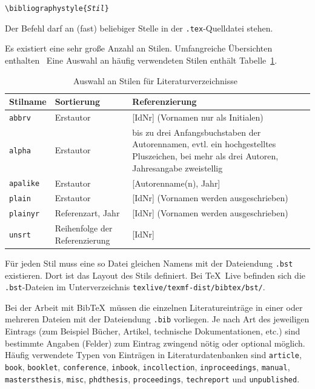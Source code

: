 \documentclass[a4paper,10pt,twoside]{scrbook}
\begin{document}
\begin{boxedminipage}{\textwidth}
	\texttt{\textbackslash bibliographystyle\{\textsl{Stil}\}} 
\end{boxedminipage}


Der Befehl darf an (fast) beliebiger Stelle in der \verb!.tex!-Quelldatei stehen.


Es existiert eine sehr große Anzahl an Stilen. Umfangreiche Übersichten enthalten~\cite{voss2007referenz,BibtexStylesShareLaTeXWebseite} Eine Auswahl an häufig verwendeten Stilen enthält Tabelle~\ref{Tabelle_Stile_Literaturverzeichnisse}. 



\begin{table}[h!tb]
	\centering
	\caption[Auswahl an Stilen für Literaturverzeichnisse]{Auswahl an Stilen für Literaturverzeichnisse~\cite{Wikibooks_LaTeX_Woerterbuch}}
	\label{Tabelle_Stile_Literaturverzeichnisse}       %
	\begin{tabularx}{\textwidth}{lp{3cm}p{7.5cm}}
		\hline
		Stilname & Sortierung & Referenzierung  \\
		\hline
		\texttt{abbrv} & Erstautor & [IdNr] (Vornamen nur als Initialen) \\
		\texttt{alpha} & Erstautor & bis zu drei Anfangsbuchstaben der Autorennamen, evtl. ein hochgestelltes Pluszeichen, bei mehr als drei Autoren, Jahresangabe zweistellig \\			
		\texttt{apalike} & Erstautor & [Autorenname(n), Jahr] \\
		\texttt{plain}   & Erstautor & [IdNr] (Vornamen werden ausgeschrieben) \\
        \texttt{plainyr} & Referenzart, Jahr   & [IdNr] (Vornamen werden ausgeschrieben) \\
        \texttt{unsrt}   & Reihenfolge der Referenzierung & [IdNr] \\
		\hline
	\end{tabularx}
\end{table}

Für jeden Stil muss eine so Datei gleichen Namens mit der Dateiendung \verb!.bst! existieren. Dort ist das Layout des Stils definiert.
Bei \TeX~Live befinden sich die \verb!.bst!-Dateien im Unterverzeichnis \verb|texlive/texmf-dist/bibtex/bst/|.


Bei der Arbeit mit Bib\TeX\ müssen die einzelnen Literatureinträge in einer oder mehreren Dateien mit der Dateiendung
\verb|.bib| vorliegen. Je nach Art des jeweiligen Eintrags (zum Beispiel Bücher, Artikel, technische Dokumentationen, etc.) sind bestimmte Angaben (\glqq Felder\grqq) zum Eintrag zwingend nötig oder optional möglich. Häufig verwendete Typen von Einträgen in Literaturdatenbanken sind \texttt{article}, \texttt{book}, \texttt{booklet}, \texttt{conference}, \texttt{inbook}, \texttt{incollection}, \texttt{inproceedings}, \texttt{manual}, \texttt{mastersthesis}, \texttt{misc}, \texttt{phdthesis}, \texttt{proceedings}, \texttt{techreport} und \texttt{unpublished}.
\end{document}
